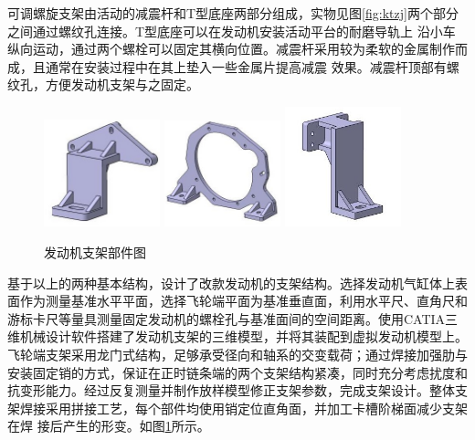 \par 可调螺旋支架由活动的减震杆和T型底座两部分组成，实物见图\ref{fig:ktzj}两个部分之间通过螺纹孔连接。T型底座可以在发动机安装活动平台的耐磨导轨上
沿小车纵向运动，通过两个螺栓可以固定其横向位置。减震杆采用较为柔软的金属制作而成，且通常在安装过程中在其上垫入一些金属片提高减震
效果。减震杆顶部有螺纹孔，方便发动机支架与之固定。
\begin{figure}[h]
	\centering
	\includegraphics[width=0.3\textwidth]{thesis_figure/platformer_chapter/zj1}
	\includegraphics[width=0.3\textwidth]{thesis_figure/platformer_chapter/zj2}
	\includegraphics[width=0.3\textwidth]{thesis_figure/platformer_chapter/zj3}
	\caption{发动机支架部件图}
	\label{fig:zjbjt}
\end{figure}
\par 基于以上的两种基本结构，设计了改款发动机的支架结构。选择发动机气缸体上表面作为测量基准水平平面，选择飞轮端平面为基准垂直面，利用水平尺、直角尺和
游标卡尺等量具测量固定发动机的螺栓孔与基准面间的空间距离。使用CATIA三维机械设计软件搭建了发动机支架的三维模型，并将其装配到虚拟发动机模型上。
飞轮端支架采用龙门式结构，足够承受径向和轴系的交变载荷；通过焊接加强肋与安装固定销的方式，保证在正时链条端的两个支架结构紧凑，同时充分考虑扰度和
抗变形能力。经过反复测量并制作放样模型修正支架参数，完成支架设计。整体支架焊接采用拼接工艺，每个部件均使用销定位直角面，并加工卡槽阶梯面减少支架在焊
接后产生的形变。如图\ref{fig:zjbjt}所示。
